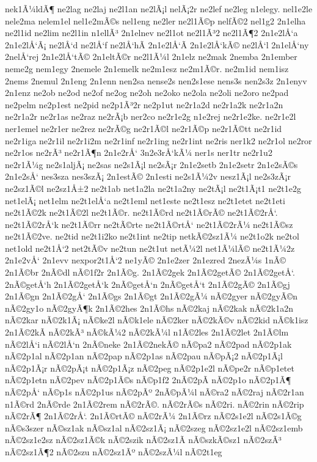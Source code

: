 {nek1Ã¼ldÃ¶
ne2lag
ne2laj
ne2l1an
ne2lÃ¡l
nelÃ¡2r
ne2lef
ne2leg
n1elegy.
nel1e2le
nele2ma
nelem1el
nel1e2mÃ©s
nel1eng
ne2ler
ne2l1Ã©p
nelfÃ©2
nel1g2
2n1elha
ne2l1id
ne2lim
ne2l1in
n1ellÃ³
2n1elnev
ne2l1ot
ne2l1Ã³2
ne2l1Ã¶2
2n1e2lÅ‘a
2n1e2lÅ‘Ã¡
ne2lÅ‘d
ne2lÅ‘f
ne2lÅ‘hÃ­
2n1e2lÅ‘Ã­
2n1e2lÅ‘kÃ©
ne2lÅ‘l
2n1elÅ‘ny
2nelÅ‘rej
2n1e2lÅ‘tÃ©
2n1eltÃ©r
ne2l1Ã¼l
2n1elz
ne2mak
2nemba
2n1ember
neme2g
nem1egy
2nemele
2n1emelk
ne2m1esz
ne2m1Ã©r.
ne2m1id
nem1isz
2nems
2nemul
2n1eng
2n1enn
nen2sa
nense2s
nen2s1ese
nens3s
nen2s3z
2n1enyv
2n1enz
ne2ob
ne2od
ne2of
ne2og
ne2oh
ne2oko
ne2ola
ne2oli
ne2oro
ne2pad
ne2pelm
ne2p1est
ne2pid
ne2p1Ã³2r
ne2p1ut
ne2r1a2d
ne2r1a2k
ne2r1a2n
ne2r1a2r
ne2r1as
ne2raz
ne2rÃ¡b
ner2co
ne2r1e2g
n1e2rej
ne2r1e2ke.
ne2r1e2l
ner1emel
ne2r1er
ne2rez
ne2rÃ©g
ne2r1Ã©l
ne2r1Ã©p
ne2r1Ã©tt
ne2r1id
ne2r1iga
ne2r1il
ne2r1i2m
ne2r1inf
ne2r1ing
ne2r1int
ne2ris
ner1k2
ne2r1ol
ne2ror
ne2r1os
ne2rÃ³
ne2r1Ã¶n
2n1e2rÅ‘
3n2e3rÅ‘kÃ¼
ner1s
ner1tr
ne2r1u2
ne2r1Ã¼g
ne2s1aljÃ¡
ne2sas
ne2s1Ã¡l
ne2sÃ¡r
2n1e2setb
2n1e2setr
2n1e2sÃ©s
2n1e2sÅ‘
nes3sza
nes3szÃ¡
2n1estÃ©
2n1esti
ne2s1Ã¼2v
nesz1Ã¡l
ne2s3zÃ¡r
ne2sz1Ã©l
ne2sz1Å±2
ne2t1ab
net1a2la
ne2t1a2ny
ne2tÃ¡l
ne2t1Ã¡t1
ne2t1e2g
net1elÃ¡
net1elm
ne2t1elÅ‘a
ne2t1eml
net1este
ne2t1esz
ne2t1etet
ne2t1eti
ne2t1Ã©2k
ne2t1Ã©2l
ne2t1Ã©r.
ne2t1Ã©rd
ne2t1Ã©rÃ©
ne2t1Ã©2rÅ‘.
ne2t1Ã©2rÅ‘k
ne2t1Ã©rr
ne2tÃ©rte
ne2t1Ã©rtÅ‘
ne2t1Ã©2rÃ¼
ne2t1Ã©sz
ne2t1Ã©2ve.
ne2tid
ne2t1i2ko
ne2t1int
ne2tip
netkÃ©2sz1Ã¼
ne2t1o2k
ne2tol
net1old
ne2t1Å‘2
net2tÃ©v
ne2tun
ne2t1ut
netÃ¼2l
net1Ã¼lÃ©
ne2t1Ã¼2z
2n1e2vÅ‘
2n1evv
nexpor2t1Å‘2
ne1yÃ©
2n1e2zer
2n1ezred
2nezÃ¼s
1nÃ©
2n1Ã©br
2nÃ©dl
nÃ©1f2r
2n1Ã©g.
2n1Ã©2gek
2n1Ã©2getÃ©
2n1Ã©2getÅ‘.
2nÃ©getÅ‘h
2n1Ã©2getÅ‘k
2nÃ©getÅ‘n
2nÃ©getÅ‘t
2n1Ã©2gÃ©
2n1Ã©gj
2n1Ã©gn
2n1Ã©2gÅ‘
2n1Ã©gs
2n1Ã©gt
2n1Ã©2gÃ¼
nÃ©2gyer
nÃ©2gyÃ©n
nÃ©2gy1o
nÃ©2gyÃ¶k
2n1Ã©2hes
2n1Ã©hs
nÃ©2kaj
nÃ©2kak
nÃ©2k1a2n
nÃ©2kar
nÃ©2k1Ã¡
nÃ©ke2l
nÃ©k1ele
nÃ©2ker
nÃ©2kÃ©v
nÃ©2kid
nÃ©k1isz
2n1Ã©2kÃ­
nÃ©2kÃ³
nÃ©kÃ¼2
nÃ©2kÃ¼l
n1Ã©2les
2n1Ã©2let
2n1Ã©lm
nÃ©2lÅ‘i
nÃ©2lÅ‘n
2nÃ©neke
2n1Ã©2nekÃ©
nÃ©pa2
nÃ©2pad
nÃ©2p1ak
nÃ©2p1al
nÃ©2p1an
nÃ©2pap
nÃ©2p1as
nÃ©2pau
nÃ©pÃ¡2
nÃ©2p1Ã¡l
nÃ©2p1Ã¡r
nÃ©2pÃ¡t
nÃ©2p1Ã¡z
nÃ©2peg
nÃ©2p1e2l
nÃ©pe2r
nÃ©p1etet
nÃ©2p1etn
nÃ©2pev
nÃ©2p1Ã©s
nÃ©p1f2
2nÃ©2pÃ­
nÃ©2p1o
nÃ©2p1Ã¶
nÃ©2pÅ‘
nÃ©p1s
nÃ©2p1us
nÃ©2pÃº
2nÃ©pÃ¼l
nÃ©ra2
nÃ©2raj
nÃ©2r1an
n1Ã©rd
2nÃ©rde
2n1Ã©2rem
nÃ©2rÃ©.
nÃ©2rÃ©s
nÃ©2ri.
nÃ©2rin
nÃ©2rip
nÃ©2rÃ¶
2n1Ã©2rÅ‘.
2n1Ã©rtÃ©
nÃ©2rÃ¼
2n1Ã©rz
nÃ©2s1e2l
nÃ©2s1Ã©g
nÃ©s3szer
nÃ©sz1ak
nÃ©sz1al
nÃ©2sz1Ã¡
nÃ©2szeg
nÃ©2sz1e2l
nÃ©2sz1emb
nÃ©2sz1e2sz
nÃ©2sz1Ã©k
nÃ©2szik
nÃ©2sz1Ã­
nÃ©szkÃ©sz1
nÃ©2szÃ³
nÃ©2sz1Ã¶2
nÃ©2szu
nÃ©2sz1Ãº
nÃ©2szÃ¼l
nÃ©2t1eg
}

